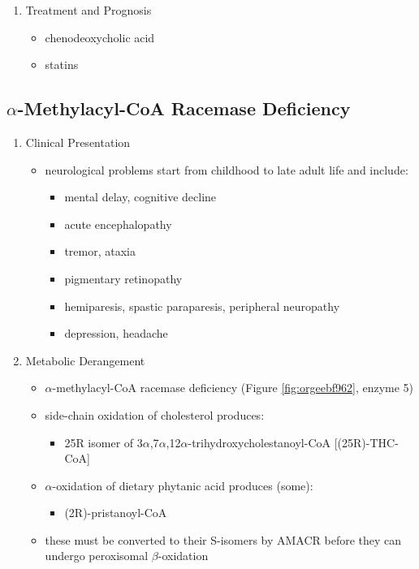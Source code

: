 \documentclass{scrartcl}
\begin{document}
\begin{enumerate}
\item Treatment and Prognosis
\label{sec:org8f65866}
\begin{itemize}
\item chenodeoxycholic acid
\item statins
\end{itemize}
\end{enumerate}
\subsection{\(\alpha\)-Methylacyl-CoA Racemase Deficiency}
\label{sec:orgf2fa48c}
\begin{enumerate}
\item Clinical Presentation
\label{sec:orgf79a150}
\begin{itemize}
\item neurological problems start from childhood to late adult life and
include:
\begin{itemize}
\item mental delay, cognitive decline
\item acute encephalopathy
\item tremor, ataxia
\item pigmentary retinopathy
\item hemiparesis, spastic paraparesis, peripheral neuropathy
\item depression, headache
\end{itemize}
\end{itemize}

\item Metabolic Derangement
\label{sec:orgc929828}
\begin{itemize}
\item \(\alpha\)-methylacyl-CoA racemase deficiency (Figure \ref{fig:orgeebf962}, enzyme 5)
\item side-chain oxidation of cholesterol produces:
\begin{itemize}
\item 25R isomer of 3\(\alpha\),7\(\alpha\),12\(\alpha\)-trihydroxycholestanoyl-CoA [(25R)-THC-CoA]
\end{itemize}
\item \(\alpha\)-oxidation of dietary phytanic acid produces (some):
\begin{itemize}
\item (2R)-pristanoyl-CoA
\end{itemize}
\item these must be converted to their S-isomers by AMACR before they can
undergo peroxisomal \(\beta\)-oxidation
\end{itemize}


\end{enumerate}
\end{document}
